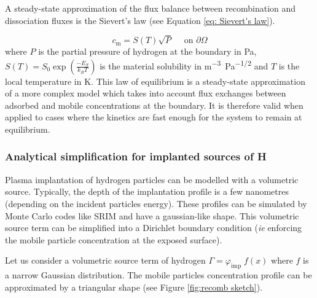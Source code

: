 A steady-state approximation of the flux balance between recombination and dissociation fluxes is the Sievert's law (see Equation \ref{eq: Sievert's law}).

\begin{equation}
    c_\mathrm{m} = S(T) \sqrt{P}\quad \text { on } \partial \Omega
    \label{eq: Sievert's law}
\end{equation}
where $P$ is the partial pressure of hydrogen at the boundary in \si{Pa}, $S(T)=S_0 \exp(\frac{-E_S}{k_B T})$ is the material solubility in \si{m^{-3}.Pa^{-1/2}} and $T$ is the local temperature in \si{K}.
This law of equilibrium is a steady-state approximation of a more complex model which takes into account flux exchanges between adsorbed and mobile concentrations at the boundary.
It is therefore valid when applied to cases where the kinetics are fast enough for the system to remain at equilibrium.

\subsubsection{Analytical simplification for implanted sources of H} \label{triangle model}

Plasma implantation of hydrogen particles can be modelled with a volumetric source.
Typically, the depth of the implantation profile is a few nanometres (depending on the incident particles energy).
These profiles can be simulated by Monte Carlo codes like SRIM  and have a gaussian-like shape.
This volumetric source term can be simplified into a Dirichlet boundary condition (\textit{ie} enforcing the mobile particle concentration at the exposed surface).

Let us consider a volumetric source term of hydrogen $\Gamma = \varphi_\mathrm{imp} \; f(x)$ where $f$ is a narrow Gaussian distribution.
The mobile particles concentration profile can be approximated by a triangular shape  (see Figure \ref{fig:recomb sketch}).

